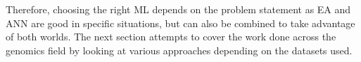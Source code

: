 Therefore, choosing the right ML depends on the problem statement as EA and ANN are good in specific situations, but can also be combined to take advantage of both worlds. The next section attempts to cover the work done across the genomics field by looking at various approaches depending on the datasets used.






